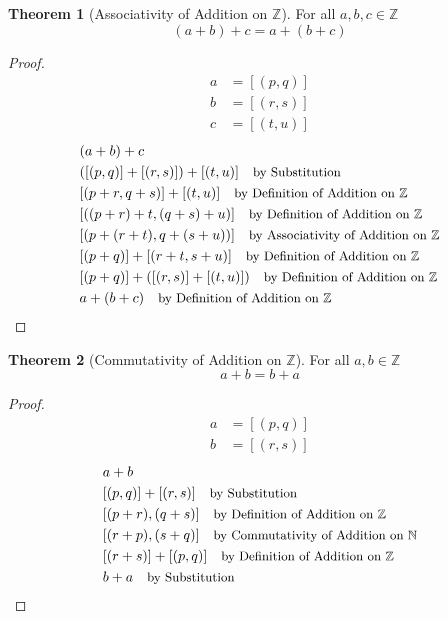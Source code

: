 \documentclass[12pt]{article}
\newcommand{\stext}[1]{\quad\text{\small #1}}
\theoremstyle{definition}
\newtheorem{theorem}{Theorem}
\begin{document}
\begin{theorem}[Associativity of Addition on $\mathbb{Z}$]
    For all $a, b, c \in \mathbb{Z}$
    \begin{equation*}
        (a + b) + c = a + (b + c)
    \end{equation*}
\end{theorem}
\begin{proof}
    \begin{align*}
        a &= [(p, q)] \\ 
        b &= [(r, s)] \\ 
        c &= [(t, u)] 
    \end{align*}
    \begin{align*}
        & (a + b) + c \\
        & ([(p, q)] + [(r, s)]) + [(t, u)] \stext{by Substitution}\\
        & [(p + r, q + s)] + [(t, u)] \stext{by Definition of Addition on $\mathbb{Z}$}\\ 
        & [((p + r) + t, (q + s) + u)] \stext{by Definition of Addition on $\mathbb{Z}$}\\
        & [(p + (r + t), q + (s + u))] \stext{by Associativity of Addition on $\mathbb{Z}$}\\
        & [(p + q)] + [(r + t, s + u)] \stext{by Definition of Addition on $\mathbb{Z}$}\\ 
        & [(p + q)] + ([(r, s)] + [(t, u)]) \stext{by Definition of Addition on $\mathbb{Z}$}\\ 
        & a + (b + c) \stext{by Definition of Addition on $\mathbb{Z}$}
    \end{align*}
\end{proof}

\begin{theorem}[Commutativity of Addition on $\mathbb{Z}$]
    For all $a, b \in \mathbb{Z}$
    \begin{equation*}
        a + b = b + a
    \end{equation*}
\end{theorem}
\begin{proof}
    \begin{align*}
        a &= [(p, q)] \\ 
        b &= [(r, s)]
    \end{align*}
    \begin{align*}
        & a + b \\ 
        & [(p, q)] + [(r, s)] \stext{by Substitution}\\
        & [(p + r), (q + s)] \stext{by Definition of Addition on $\mathbb{Z}$}\\ 
        & [(r + p), (s + q)] \stext{by Commutativity of Addition on $\mathbb{N}$}\\ 
        & [(r + s)] + [(p, q)] \stext{by Definition of Addition on $\mathbb{Z}$}\\ 
        & b + a \stext{by Substitution}
    \end{align*}
\end{proof}
\end{document}
